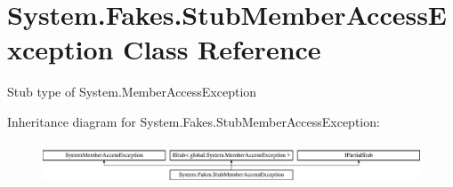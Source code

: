 \hypertarget{class_system_1_1_fakes_1_1_stub_member_access_exception}{\section{System.\-Fakes.\-Stub\-Member\-Access\-Exception Class Reference}
\label{class_system_1_1_fakes_1_1_stub_member_access_exception}
}


Stub type of System.\-Member\-Access\-Exception 


Inheritance diagram for System.\-Fakes.\-Stub\-Member\-Access\-Exception\-:\begin{figure}[H]
\begin{center}
\leavevmode
\includegraphics[height=1.257015cm]{class_system_1_1_fakes_1_1_stub_member_access_exception}
\end{center}
\end{figure}
